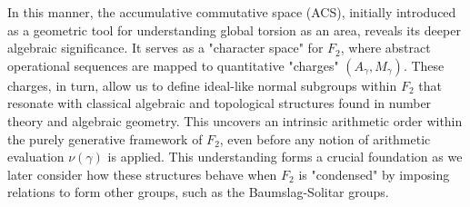 In this manner, the accumulative commutative space (ACS), initially introduced as a geometric tool for understanding global torsion as an area, reveals its deeper algebraic significance. It serves as a "character space" for $F_2$, where abstract operational sequences are mapped to quantitative "charges" $(A_\gamma, M_\gamma)$. These charges, in turn, allow us to define ideal-like normal subgroups within $F_2$ that resonate with classical algebraic and topological structures found in number theory and algebraic geometry. This uncovers an intrinsic arithmetic order within the purely generative framework of $F_2$, even before any notion of arithmetic evaluation $\nu(\gamma)$ is applied. This understanding forms a crucial foundation as we later consider how these structures behave when $F_2$ is "condensed" by imposing relations to form other groups, such as the Baumslag-Solitar groups.

